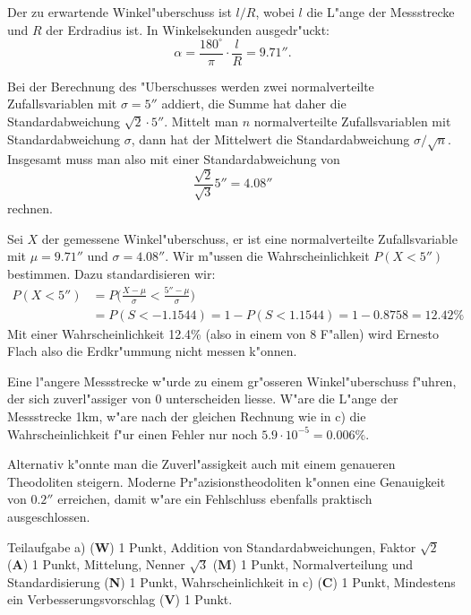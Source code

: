 \begin{loesung}
\begin{teilaufgaben}
\item
Der zu erwartende Winkel"uberschuss ist $l/R$, wobei $l$ die L"ange der
Messstrecke und $R$ der Erdradius ist.
In Winkelsekunden ausgedr"uckt: 
\[
\alpha = \frac{180^\circ}{\pi}\cdot\frac{l}{R}=9.71''.
\]
\item
Bei der Berechnung des "Uberschusses werden zwei normalverteilte
Zufallsvariablen mit $\sigma=5''$ addiert, die Summe hat daher
die Standardabweichung $\sqrt{2}\cdot 5''$.
Mittelt man $n$ normalverteilte Zufallsvariablen mit Standardabweichung
$\sigma$, dann hat der Mittelwert die Standardabweichung $\sigma/\sqrt{n}$.
Insgesamt muss man also mit einer Standardabweichung von 
\[
\frac{\sqrt{2}}{\sqrt{3}}5''= 4.08''
\]
rechnen.
\item
Sei $X$ der gemessene Winkel"uberschuss, er ist eine normalverteilte
Zufallsvariable mit $\mu=9.71''$ und $\sigma=4.08''$.
Wir m"ussen die Wahrscheinlichkeit $P(X < 5'')$ bestimmen.
Dazu standardisieren wir:
\begin{align*}
P(X<5'')
&=
P\biggl(
\frac{X-\mu}{\sigma}<\frac{5''-\mu}{\sigma}\biggr)
\\
&=P(S<-1.1544)
=1-P(S<1.1544)
=1-0.8758 = 12.42\%
\end{align*}
Mit einer Wahrscheinlichkeit 12.4\% (also in einem von 8 F"allen)
wird Ernesto Flach also die Erdkr"ummung nicht messen k"onnen.
\item
Eine l"angere Messstrecke w"urde zu einem gr"osseren Winkel"uberschuss
f"uhren, der sich zuverl"assiger von $0$ unterscheiden liesse.
W"are die L"ange der Messstrecke 1km, w"are nach der gleichen Rechnung
wie in c) die Wahrscheinlichkeit f"ur einen Fehler nur noch
$5.9\cdot10^{-5}=0.006\%$.

Alternativ k"onnte man die Zuverl"assigkeit auch mit einem genaueren
Theodoliten steigern.
Moderne Pr"azisionstheodoliten k"onnen eine Genauigkeit von $0.2''$
erreichen, damit w"are ein Fehlschluss ebenfalls praktisch ausgeschlossen.
\qedhere
\end{teilaufgaben}
\end{loesung}

\begin{bewertung}
Teilaufgabe a) ({\bf W}) 1 Punkt,
Addition von Standardabweichungen, Faktor $\sqrt{2}$ ({\bf A}) 1 Punkt,
Mittelung, Nenner $\sqrt{3}$ ({\bf M}) 1 Punkt,
Normalverteilung und Standardisierung ({\bf N}) 1 Punkt,
Wahrscheinlichkeit in c) ({\bf C}) 1 Punkt,
Mindestens ein Verbesserungsvorschlag ({\bf V}) 1 Punkt.
\end{bewertung}



